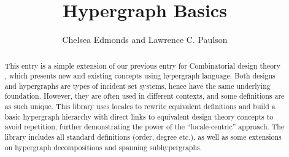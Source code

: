 \documentclass[11pt,a4paper]{article}
\begin{document}
\title{Hypergraph Basics}
\author{Chelsea Edmonds and Lawrence C. Paulson}
\maketitle

\begin{abstract}
    This entry is a simple extension of our previous entry for Combinatorial design theory \cite{Design_Theory-AFP}, which presents new and existing concepts using hypergraph language. Both designs and hypergraphs are types of incident set systems, hence have the same underlying foundation. However, they are often used in different contexts, and some definitions are as such unique. This library uses locales to rewrite equivalent definitions and build a basic hypergraph hierarchy with direct links to equivalent design theory concepts to avoid repetition, further demonstrating the power of the ``locale-centric'' approach. The library includes all standard definitions (order, degree etc.), as well as some extensions on hypergraph decompositions and spanning subhypergraphs.
\end{abstract}

\tableofcontents





\end{document}
